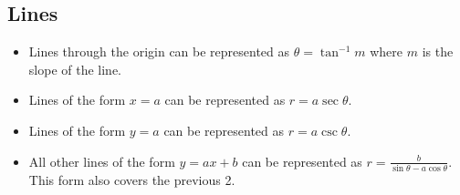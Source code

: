 \subsection{Lines}
\begin{itemize}
	\item Lines through the origin can be represented as $\theta=\tan^{-1}{m}$ where $m$ is the slope of the line.
	\item Lines of the form $x=a$ can be represented as $r=a\sec{\theta}$.
	\item Lines of the form $y=a$ can be represented as $r=a\csc{\theta}$.
	\item All other lines of the form $y=ax+b$ can be represented as $r=\frac{b}{\sin{\theta}-a\cos{\theta}}$. This form also covers the previous 2.
\end{itemize}